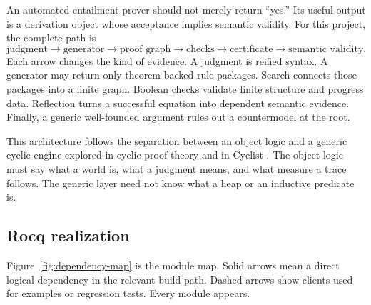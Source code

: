 \documentclass[11pt,oneside]{book}
\DeclareRobustCommand{\file}[1]{\texttt{\detokenize{#1}}}
\newcommand{\rocqreal}{\subsection*{Rocq realization}}
\begin{document}
An automated entailment prover should not merely return ``yes.''  Its useful
output is a derivation object whose acceptance implies semantic validity.  For
this project, the complete path is
\[
 \boxed{\text{judgment}}
 \longrightarrow \boxed{\text{generator}}
 \longrightarrow \boxed{\text{proof graph}}
 \longrightarrow \boxed{\text{checks}}
 \longrightarrow \boxed{\text{certificate}}
 \longrightarrow \boxed{\text{semantic validity}}.
\]
Each arrow changes the kind of evidence.  A judgment is reified syntax.  A
generator may return only theorem-backed rule packages.  Search connects those
packages into a finite graph.  Boolean checks validate finite structure and
progress data.  Reflection turns a successful equation into dependent semantic
evidence.  Finally, a generic well-founded argument rules out a countermodel at
the root.

This architecture follows the separation between an object logic and a generic
cyclic engine explored in cyclic proof theory and in Cyclist
\cite{brotherston2011sequent,brotherston2012generic}.  The object logic must say
what a world is, what a judgment means, and what measure a trace follows.  The
generic layer need not know what a heap or an inductive predicate is.

\rocqreal

Figure~\ref{fig:dependency-map} is the module map.  Solid arrows mean a direct
logical dependency in the relevant build path.  Dashed arrows show clients used
for examples or regression tests.  Every \file{SP/*.v} module appears.
\end{document}
